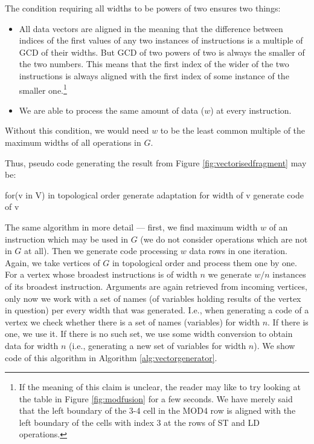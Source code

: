 \begin{rem}
  The condition requiring all widths to be powers of two ensures two things:
  \begin{itemize}
    \item All data vectors are aligned in the meaning that the difference between indices of the first values of any two instances of instructions is a multiple of GCD of their widths. But GCD of two powers of two is always the smaller of the two numbers. This means that the first index of the wider of the two instructions is always aligned with the first index of some instance of the smaller one.\footnote{If the meaning of this claim is unclear, the reader may like to try looking at the table in Figure \ref{fig:modfusion} for a few seconds. We have merely said that the left boundary of the 3-4 cell in the MOD4 row is aligned with the left boundary of the cells with index 3 at the rows of ST and LD operations.}
    \item We are able to process the same amount of data ($w$) at every instruction.
  \end{itemize}
  Without this condition, we would need $w$ to be the least common multiple of the maximum widths of all operations in $G$. 
\end{rem}

Thus, pseudo code generating the result from Figure \ref{fig:vectorisedfragment} may be:

\begin{code}
for(v in V) in topological order
{
  generate adaptation for width of v
  generate code of v
}
\end{code}

The same algorithm in more detail --- first, we find maximum width $w$ of an instruction which may be used in $G$ (we do not consider operations which are not in $G$ at all). Then we generate code processing $w$ data rows in one iteration. Again, we take vertices of $G$ in topological order and process them one by one. For a vertex whose broadest instructions is of width $n$ we generate $w/n$ instances of its broadest instruction. Arguments are again retrieved from incoming vertices, only now we work with a set of names (of variables holding  results of the vertex in question) per every width that was generated. I.e., when generating a code of a vertex we check whether there is a set of names (variables) for width $n$. If there is one, we use it. If there is no such set, we use some width conversion to obtain data for width $n$ (i.e., generating a new set of variables for width $n$). We show code of this algorithm in Algorithm \ref{alg:vectorgenerator}.

